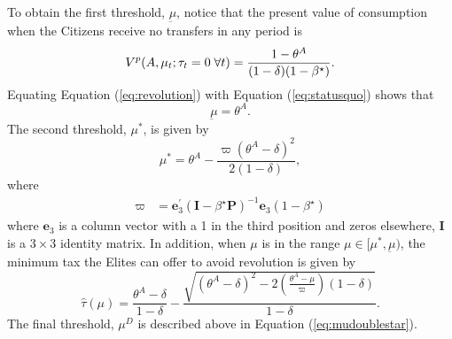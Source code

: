 To obtain the first threshold, $\underbar{\ensuremath{\mu}}$, notice that the present value of consumption when the Citizens receive no transfers in any period is
\begin{equation}
V^{p}(A,\mu_{t}; \tau_t = 0 \; \forall t) =\frac{1-\theta^A}{(1-\delta)(1-\beta^{\star})}.\label{eq:statusquo} \\
\end{equation}
Equating Equation (\ref{eq:revolution}) with Equation (\ref{eq:statusquo}) shows that 
\begin{equation}
\underbar{\ensuremath{\mu}} = \theta^A.\label{eq:muunderbar}
\end{equation} 
The second threshold, $\mu^*$, is given by
\begin{equation}
\mu^* =\theta^A-\frac{\varpi(\theta^A-\delta)^2}{2(1-\delta)},\label{eq:mustar}
\end{equation}
where
\begin{align*}
\varpi & =  \mathbf{e}_3^\prime(\mathbf{I}-\beta^\star \mathbf{P})^{-1} \mathbf{e}_3(1-\beta^\star)
\end{align*}
where $\mathbf{e}_3$ is a column vector with a 1 in the third position and zeros elsewhere, $\mathbf{I}$ is a $3\times 3$ identity matrix.  In addition, when $\mu$ is in the range $\mu \in [\mu^{*},\underbar{\ensuremath{\mu}})$, the minimum tax the Elites can offer to avoid revolution is given by
\begin{equation}
\hat{\tau}(\mu) =\frac{\theta^A-\delta}{1-\delta} - \frac{\sqrt{\left(\theta^A-\delta\right)^2 - 2\left(\frac{\theta^A-\mu}{\varpi}\right)(1-\delta)}}{1-\delta}.\label{eq:mintax}
\end{equation}
The final threshold, $\mu^{D}$ is described above in Equation (\ref{eq:mudoublestar}).

